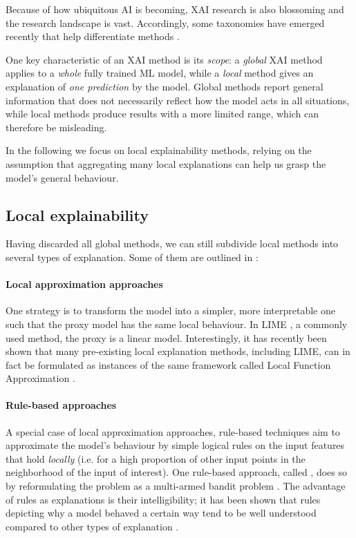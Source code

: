 \documentclass[../main.tex]{subfiles}
\begin{document}
Because of how ubiquitous AI is becoming, XAI research is also blossoming and the research landscape is vast.
Accordingly, some taxonomies have emerged recently that help differentiate methods \cite{zhangSurvey2021, bellePrinciples2021}.

One key characteristic of an XAI method is its \emph{scope}: a \emph{global} XAI method applies to a \emph{whole} fully trained ML model, while a \emph{local} method gives an explanation of \emph{one prediction} by the model.
Global methods report general information that does not necessarily reflect
how the model acts in all situations, while local methods produce results with
a more limited range, which can therefore be misleading.


In the following we focus on local explainability methods, relying on the assumption that aggregating many local explanations can help us grasp the model's general behaviour.

\subsection{Local explainability}

Having discarded all global methods, we can still subdivide local methods into several types of explanation. Some of them are outlined in \cite{bellePrinciples2021}:

\paragraph{Local approximation approaches}

One strategy is to transform the model into a simpler, more interpretable one such that the proxy model has the same local behaviour. In LIME \cite{ribeiroWhy2016}, a commonly used method, the proxy is a linear model.
Interestingly, it has recently been shown that many pre-existing local explanation methods, including LIME, can in fact be formulated as instances of the same framework called Local Function Approximation \cite{hanWhich2022}.

\paragraph{Rule-based approaches}

A special case of local approximation approaches, rule-based techniques aim to approximate the model's behaviour by simple logical rules on the input features that hold \emph{locally} (i.e. for a high proportion of other input points in the neighborhood of the input of interest).
One rule-based approach, called , does so by reformulating the problem as a multi-armed bandit problem \cite{ribeiroAnchors2018}.
The advantage of rules as explanations is their intelligibility; it has been shown that rules depicting why a model behaved a certain way tend to be well understood compared to other types of explanation \cite{limWhy2009}.
\end{document}
